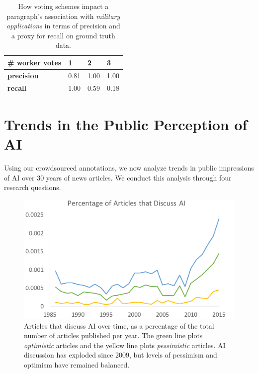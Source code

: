 \documentclass[letterpaper]{article}
\begin{document}
\begin{table}[!ht]
\renewcommand{\arraystretch}{1.3}
\begin{tabular}{p{8.5em}p{3em}p{3em}p{3em}}
\textbf{\# worker votes} & 1 & 2 & 3\\
\hline
\textbf{precision} & 0.81 & 1.00 & 1.00 \\
\textbf{recall} & 1.00 & 0.59 & 0.18 \\

\end{tabular}
\caption{How voting schemes impact a paragraph's association with \textit{military applications} in terms of precision and a proxy for recall on ground truth data. %
}
\label{tbl:rates}
\end{table}

\section{Trends in the Public Perception of AI}

Using our crowdsourced annotations, we now analyze trends in public impressions of AI over 30 years of news articles. We conduct this analysis through four research questions.

\begin{figure}[!t]
\centering
\includegraphics[width=1.0\columnwidth]{ai-over-time2}
\caption{Articles that discuss AI over time, as a percentage of the total number of articles published per year. The green line plots \textit{optimistic} articles and the yellow line plots \textit{pessimistic} articles. AI discussion has exploded since 2009, but levels of pessimism and optimism have remained balanced.}
\label{fig:general}
\end{figure}
\end{document}

